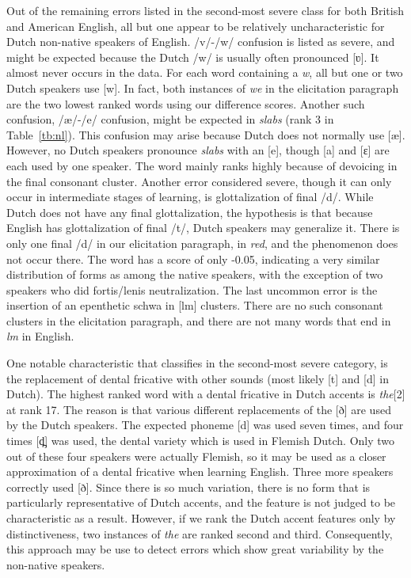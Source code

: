 \documentclass[output=paper]{LSP/langsci}
\begin{document}
Out of the remaining errors listed in the second-most severe class for both British and American English, all but one appear to be relatively uncharacteristic for Dutch non-native speakers of English. /v/-/w/ confusion is listed as severe, and might be expected because the Dutch /w/ is usually often pronounced 
[ʋ]. It almost never occurs in the data. For each word containing a \textit{w}, all but one or two Dutch speakers use [w]. In fact, both instances of \textit{we} in the elicitation paragraph are the two lowest ranked words using our difference scores. Another such confusion, /æ/-/e/ confusion, might be expected in \textit{slabs} (rank 3 in Table~\ref{tb:nl}). This confusion may arise because Dutch does not normally use [æ]. However, no Dutch speakers pronounce \textit{slabs} with an [e], though [a] and [ɛ] are each used by one speaker. The word mainly ranks highly because of devoicing in the final consonant cluster. Another error considered severe, though it can only occur in intermediate stages of learning, is glottalization of final /d/. While Dutch does not have any final glottalization, the hypothesis is that because English has glottalization of final /t/, Dutch speakers may generalize it. There is only one final /d/ in our elicitation paragraph, in \textit{red}, and the phenomenon does not occur there. The word has a score of only -0.05, indicating a very similar distribution of forms as among the native speakers, with the exception of two speakers who did fortis/lenis neutralization. The last uncommon error is the insertion of an epenthetic schwa in [lm] clusters. There are no such consonant clusters in the elicitation paragraph, and there are not many words that end in \textit{lm} in English.

\largerpage 
One notable characteristic that \citet{van_den_doel_evaluation_2006} classifies in the second-most severe category, is the replacement of dental fricative with other sounds (most likely [t] and [d] in Dutch). The highest ranked word with a dental fricative in Dutch accents is \textit{the}[2] at rank 17. The reason is that various different replacements of the 
[ð] are used by the Dutch speakers. The expected phoneme [d] was used seven times, and four times [d̪] was used, the dental variety which is used in Flemish Dutch. Only two out of these four speakers were actually Flemish, so it may be used as a closer approximation of a dental fricative when learning English. Three more speakers correctly used [ð].
Since there is so much variation, there is no form that is particularly representative of Dutch accents, and the feature is not judged to be characteristic as a result. However, if we rank the Dutch accent features only by distinctiveness, two instances of \textit{the} are ranked second and third. Consequently, this approach may be use to detect errors which show great variability by the non-native speakers.
\end{document}
